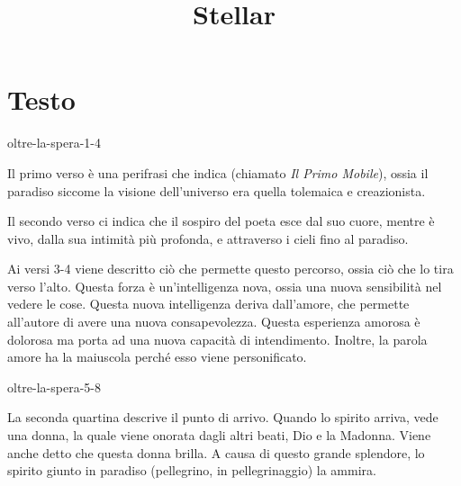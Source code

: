 \documentclass[preview]{standalone}
\begin{document}
\title{Stellar}
\genpage

\section{Testo}


\begin{snippet}{oltre-la-spera-1-4}

    Il primo verso è una perifrasi che indica  (chiamato \textit{Il Primo Mobile}), ossia il paradiso
    siccome la visione dell'universo era quella tolemaica e creazionista.
    
    Il secondo verso ci indica che il sospiro del poeta esce dal suo cuore, mentre è vivo, dalla sua intimità più profonda,
    e attraverso i cieli fino al paradiso.  
    
    Ai versi 3-4 viene descritto ciò che permette questo percorso, ossia ciò che lo tira
    verso l'alto. Questa forza è un'intelligenza nova, ossia una nuova sensibilità nel vedere le cose.
    Questa nuova intelligenza deriva dall'amore, che permette all'autore di avere una nuova consapevolezza.
    Questa esperienza amorosa è dolorosa ma porta ad una nuova capacità di intendimento.
    Inoltre, la parola amore ha la maiuscola perché esso viene personificato.
\end{snippet}

\begin{snippet}{oltre-la-spera-5-8}

    La seconda quartina descrive il punto di arrivo.
    Quando lo spirito arriva, vede una donna, la quale viene onorata dagli altri beati, Dio e la Madonna.
    Viene anche detto che questa donna brilla.
    A causa di questo grande splendore, lo spirito giunto in paradiso (pellegrino, in pellegrinaggio) la ammira.
\end{snippet}
\end{document}

